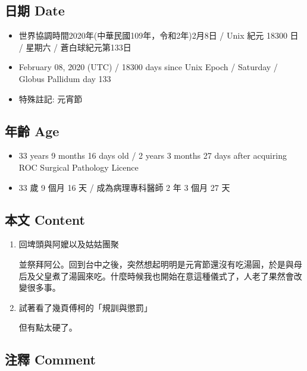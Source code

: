 \documentclass[
]{article}
\providecommand{\tightlist}{%
  \setlength{\itemsep}{0pt}\setlength{\parskip}{0pt}}
\begin{document}
\hypertarget{ux65e5ux671f-date-7}{%
\subsection{日期 Date}\label{ux65e5ux671f-date-7}}

\begin{itemize}
\tightlist
\item
  世界協調時間2020年(中華民國109年，令和2年)2月8日 / Unix 紀元 18300 日
  / 星期六 / 蒼白球紀元第133日
\item
  February 08, 2020 (UTC) / 18300 days since Unix Epoch / Saturday /
  Globus Pallidum day 133
\item
  特殊註記: 元宵節
\end{itemize}

\hypertarget{ux5e74ux9f61-age-7}{%
\subsection{年齡 Age}\label{ux5e74ux9f61-age-7}}

\begin{itemize}
\tightlist
\item
  33 years 9 months 16 days old / 2 years 3 months 27 days after
  acquiring ROC Surgical Pathology Licence
\item
  33 歲 9 個月 16 天 / 成為病理專科醫師 2 年 3 個月 27 天
\end{itemize}

\hypertarget{ux672cux6587-content-7}{%
\subsection{本文 Content}\label{ux672cux6587-content-7}}

\begin{enumerate}
\def\labelenumi{\arabic{enumi}.}
\item
  回埤頭與阿嬤以及姑姑團聚

  並祭拜阿公。回到台中之後，突然想起明明是元宵節還沒有吃湯圓，於是與母后及父皇煮了湯圓來吃。什麼時候我也開始在意這種儀式了，人老了果然會改變很多事。
\item
  試著看了幾頁傅柯的「規訓與懲罰」

  但有點太硬了。
\end{enumerate}

\hypertarget{ux6ce8ux91cb-comment-7}{%
\subsection{注釋 Comment}\label{ux6ce8ux91cb-comment-7}}
\end{document}
